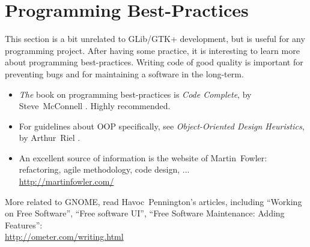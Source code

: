 \section{Programming Best-Practices}

This section is a bit unrelated to GLib/GTK+ development, but is useful for any programming project. After having some practice, it is interesting to learn more about programming best-practices. Writing code of good quality is important for preventing bugs and for maintaining a software in the long-term.

\begin{itemize}
  \item \emph{The} book on programming best-practices is \emph{Code Complete}, by Steve~McConnell \cite{code-complete}. Highly recommended.

  \item For guidelines about OOP specifically, see \emph{Object-Oriented Design Heuristics}, by Arthur~Riel \cite{oop-book}.

  \item An excellent source of information is the website of Martin~Fowler: refactoring, agile methodology, code design, ...\\
  \url{http://martinfowler.com/}
\end{itemize}

More related to GNOME, read Havoc~Pennington's articles, including ``Working on Free Software'', ``Free software UI'', ``Free Software Maintenance: Adding Features'':\\
\url{http://ometer.com/writing.html}
